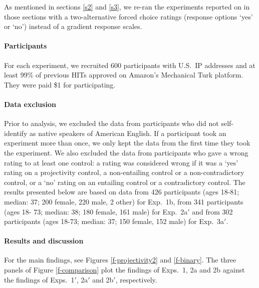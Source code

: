 \documentclass[11pt,fleqn]{article}
\newcommand{\6}{\mbox{$[\hspace*{-.6mm}[$}}
\newcommand{\9}{\mbox{$]\hspace*{-.6mm}]$}}
\begin{document}
{As mentioned in sections \ref{s2} and \ref{s3}, we re-ran the experiments reported on in those sections with a two-alternative forced choice ratings (response options `yes' or `no') instead of a gradient response scales. 

\paragraph{Participants} For each experiment, we recruited 600 participants with U.S.\ IP addresses and at least 99\% of previous HITs approved on Amazon's Mechanical Turk platform. They were paid \$1 for participating. 

\paragraph{Data exclusion} Prior to analysis, we excluded the data from participants who did not self-identify as native speakers of American English. If a participant took an experiment more than once, we only kept the data from the first time they took the experiment. We also excluded the data from participants who gave a wrong rating to at least one control: a rating was considered wrong if it was a `yes' rating on a projectivity control, a non-entailing control or a non-contradictory control, or a `no' rating on an entailing control or a contradictory control. The results presented below are based on data from 426 participants (ages 18-81; median: 37; 200 female, 220 male, 2 other) for Exp.~1b, from 341 participants (ages 18- 73; median: 38; 180 female, 161 male) for Exp.~2a$'$ and from 302 participants (ages 18-73; median: 37; 150 female, 152 male) for Exp.~3a$'$.

\paragraph{Results and discussion} For the main findings, see Figures \ref{f-projectivity2} and \ref{f-binary}. The three panels of Figure \ref{f-comparison} plot the findings of Exps.~1, 2a and 2b against the findings of Exps.~1$'$, 2a$'$ and 2b$'$, respectively.
    

    
\begin{figure}[h!]
\centering


\end{figure}}
\end{document}
